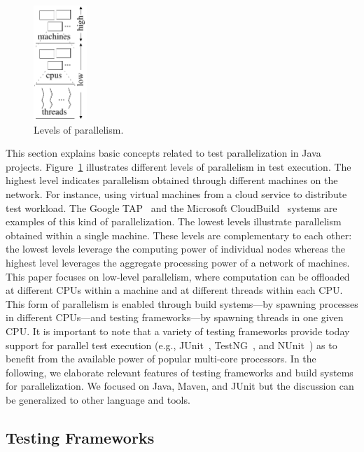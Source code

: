 \documentclass[10pt,journal,compsoc]{IEEEtran}
\begin{document}
\begin{figure}  
  \vspace{-2mm}
  \centering
  \includegraphics[width=2cm]{figs/parallel-levels-short.pdf}  
  \caption{\label{fig:levels}Levels of parallelism.}
  \vspace{-2mm}
\end{figure}
This section explains basic concepts related to test parallelization
in Java projects. Figure~\ref{fig:levels} illustrates different levels
of parallelism in test execution.  The highest level indicates
parallelism obtained through different machines on the network. For
instance, using virtual machines from a cloud service to distribute
test workload. The Google TAP~\cite{google-tap,google-ci} and the
Microsoft CloudBuild~\cite{prasad-shulte-ieee-microsoft-ci} systems
are examples of this kind of parallelization. The lowest levels
illustrate parallelism obtained within a single machine. These levels
are complementary to each other: the lowest levels leverage the
computing power of individual nodes whereas the highest level
leverages the aggregate processing power of a network of
machines. This paper focuses on low-level parallelism, where
computation can be offloaded at different CPUs within a machine and at
different threads within each CPU.  This form of parallelism is
enabled through build systems---by spawning processes in different
CPUs---and testing frameworks---by spawning threads in one given CPU.
It is important to note that a variety of testing frameworks provide
today support for parallel test execution (e.g.,
JUnit~\cite{junit-org}, TestNG~\cite{testng}, and NUnit~\cite{nunit})
as to benefit from the available power of popular multi-core
processors.  In the following, we elaborate relevant features of
testing frameworks and build systems for parallelization.  We focused
on Java, Maven, and JUnit but the discussion can be generalized to
other language and tools.

\subsection{Testing Frameworks}
\label{sec:frameworks}
\end{document}
